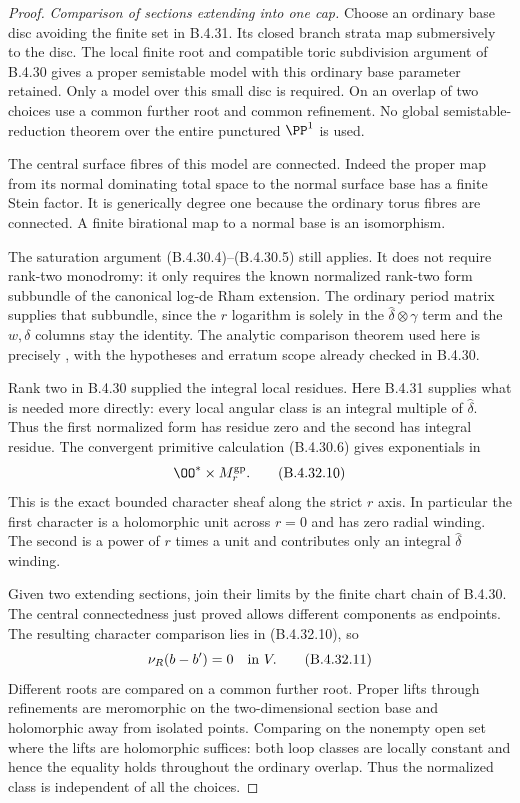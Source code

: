 \begin{proof}
\emph{Comparison of sections extending into one cap.}
Choose an ordinary base disc avoiding the finite set in
B.4.31. Its closed branch strata map submersively to the
disc. The local finite root and compatible toric subdivision
argument of B.4.30 gives a proper semistable model with this
ordinary base parameter retained. Only a model over this
small disc is required. On an overlap of two choices use a
common further root and common refinement. No global
semistable-reduction theorem over the entire punctured
$\PP^1$ is used.

The central surface fibres of this model are connected.
Indeed the proper map from its normal dominating total space
to the normal surface base has a finite Stein factor.
It is generically degree one because the ordinary torus
fibres are connected. A finite birational map to a normal
base is an isomorphism.

The saturation argument (B.4.30.4)--(B.4.30.5) still applies.
It does not require rank-two monodromy: it only requires the
known normalized rank-two form subbundle of the canonical
log-de Rham extension. The ordinary period matrix supplies
that subbundle, since the $r$ logarithm is solely in the
$\widehat\delta\otimes\gamma$ term and the $w,\delta$
columns stay the identity. The analytic comparison theorem
used here is precisely
\citet[Theorem 6.3]{IKN2005E}, with the hypotheses and erratum
scope already checked in B.4.30.

Rank two in B.4.30 supplied the integral local residues.
Here B.4.31 supplies what is needed more directly: every
local angular class is an integral multiple of
$\widehat\delta$. Thus the first normalized form has residue
zero and the second has integral residue. The convergent
primitive calculation (B.4.30.6) gives exponentials in
\[
              \OO^*\times M_r^{\rm gp}.
 \tag{B.4.32.10}
\]
This is the exact bounded character sheaf along the strict
$r$ axis. In particular the first character is a holomorphic
unit across $r=0$ and has zero radial winding. The second
is a power of $r$ times a unit and contributes only an
integral $\widehat\delta$ winding.

Given two extending sections, join their limits by the finite
chart chain of B.4.30. The central connectedness just proved
allows different components as endpoints. The resulting
character comparison lies in (B.4.32.10), so
\[
               \nu_R(b-b')=0\quad\hbox{in }V.
 \tag{B.4.32.11}
\]
Different roots are compared on a common further root.
Proper lifts through refinements are meromorphic on the
two-dimensional section base and holomorphic away from
isolated points. Comparing on the nonempty open set where
the lifts are holomorphic suffices: both loop classes are
locally constant and hence the equality holds throughout
the ordinary overlap. Thus the normalized class is
independent of all the choices.


\end{proof}
